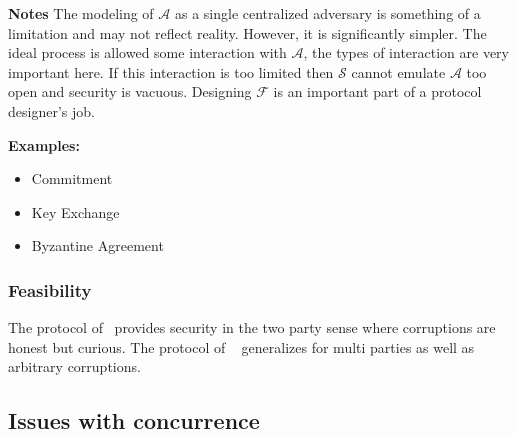 \documentclass{article}
\begin{document}
\textbf{Notes} The modeling of $\mathcal{A}$ as a single centralized adversary is something of a limitation and may not reflect reality.  However, it is significantly simpler.  The ideal process is allowed some interaction with $\mathcal{A}$, the types of interaction are very important here.  If this interaction is too limited then $\mathcal{S}$ cannot emulate $\mathcal{A}$ too open and security is vacuous.  Designing $\mathcal{F}$ is an important part of a protocol designer's job.

\textbf{Examples:}
\begin{itemize}
\item Commitment
\item Key Exchange
\item Byzantine Agreement
\end{itemize}
\subsubsection{Feasibility}
The protocol of~\cite{yao1986} provides security in the two party sense where corruptions are honest but curious.  The protocol of ~\cite{GoldreichMW87} generalizes for multi parties as well as arbitrary corruptions.
\subsection{Issues with concurrence}


\end{document}
